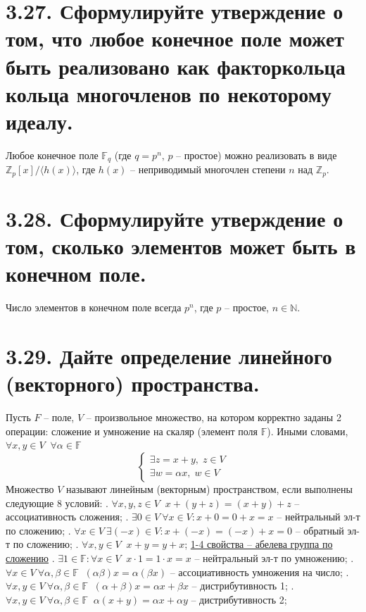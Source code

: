 \documentclass{article}
\begin{document}
\section*{\LARGE 3.27. Сформулируйте утверждение о том, что любое конечное поле может быть реализовано как факторкольца кольца многочленов по некоторому идеалу. }
Любое конечное поле $\mathbb{F}_q$ (где $q = p^n,\, p$ -- простое) можно реализовать в виде $\mathbb{Z}_p[x] / \langle h(x) \rangle$, где $h(x)$ -- неприводимый многочлен степени $n$ над $\mathbb{Z}_p$.

\section*{\LARGE 3.28. Сформулируйте утверждение о том, сколько элементов может быть в конечном поле. }
Число элементов в конечном поле всегда $p^n$, где $p$ -- простое, $n \in \mathbb{N}$.

\section*{\LARGE 3.29. Дайте определение линейного (векторного) пространства. }
Пусть $F$ -- поле, $V$ -- произвольное множество, на котором корректно заданы 2 операции: сложение и умножение на скаляр (элемент поля $\mathbb{F}$). Иными словами, $\forall x, y \in V \;\; \forall \alpha \in \mathbb{F}$
$$
\begin{cases}
\exists z = x + y, \; z \in V \\
\exists w = \alpha x, \; w \in V
\end{cases}
$$
Множество $V$ называют линейным (векторным) пространством, если выполнены следующие 8 условий:
\newline{}. $\forall x,y,z \in V \;\; x + (y + z) = (x + y) + z$ -- ассоциативность сложения;
\newline{}. $\exists 0 \in V\: \forall x \in V : x + 0 = 0 + x = x$ -- нейтральный эл-т по сложению;
\newline{}. $\forall x \in V \: \exists (-x) \in V : x + (-x) = (-x) + x = 0$ -- обратный эл-т по сложению;
\newline{}. $\forall x, y \in V \;\; x + y = y + x$;
\newline \underline{1-4 свойства -- абелева группа по сложению}
\newline{}. $\exists 1 \in \mathbb{F} : \forall x \in V \;\; x \cdot 1 = 1 \cdot x = x$ -- нейтральный эл-т по умножению;
\newline{}. $\forall x \in V \: \forall \alpha, \beta \in \mathbb{F} \;\; (\alpha\beta)x = \alpha(\beta x)$ -- ассоциативность умножения на число;
\newline{}. $\forall x, y \in V \: \forall \alpha, \beta \in \mathbb{F} \;\;(\alpha + \beta)x = \alpha x + \beta x$ -- дистрибутивность 1;
\newline{}. $\forall x, y \in V \: \forall \alpha, \beta \in \mathbb{F} \;\;\alpha(x + y) = \alpha x + \alpha y$ -- дистрибутивность 2;
\end{document}
